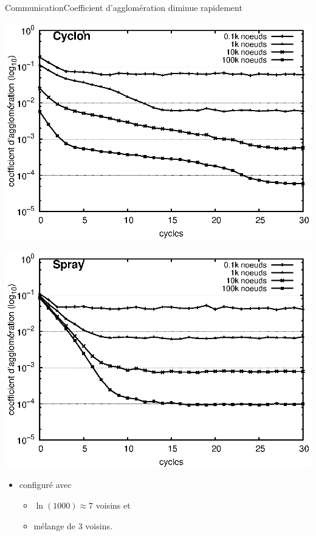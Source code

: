 \begin{frame}{Communication}{Coefficient d'agglomération diminue rapidement}
  \hspace{-1cm}
  \begin{minipage}{0.47\textwidth}
    \begin{center}
      \includegraphics[width=1.23\textwidth]{img/network/cycloncluster.eps}
    \end{center}
  \end{minipage}
  \hfill
  \begin{minipage}{0.47\textwidth}
      \includegraphics[width=1.23\textwidth]{img/network/spraycluster.eps}
  \end{minipage}

  \vspace{0.5cm}

  \begin{itemize}
  \item \CYCLON configuré avec
    \begin{itemize}
    \item  $\ln(1000) \approx 7$ voisins et
    \item mélange de $3$ voisins.
    \end{itemize}
  \end{itemize}

\end{frame}


